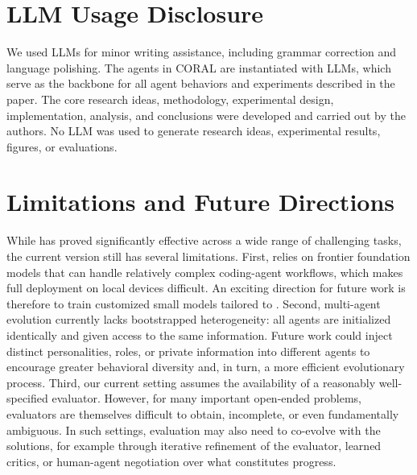 

\appendix

\section*{LLM Usage Disclosure}
We used LLMs for minor writing assistance, including grammar correction and language polishing. The agents in CORAL are instantiated with LLMs, which serve as the backbone for all agent behaviors and experiments described in the paper. The core research ideas, methodology, experimental design, implementation, analysis, and conclusions were developed and carried out by the authors. No LLM was used to generate research ideas, experimental results, figures, or evaluations.

\section{Limitations and Future Directions}
\label{app:future_directions}
While \method{} has proved significantly effective across a wide range of challenging tasks, the current version still has several limitations. First, \method{} relies on frontier foundation models that can handle relatively complex coding-agent workflows, which makes full deployment on local devices difficult. An exciting direction for future work is therefore to train customized small models tailored to \method{}. Second, multi-agent evolution currently lacks bootstrapped heterogeneity: all agents are initialized identically and given access to the same information. Future work could inject distinct personalities, roles, or private information into different agents to encourage greater behavioral diversity and, in turn, a more efficient evolutionary process. Third, our current setting assumes the availability of a reasonably well-specified evaluator. However, for many important open-ended problems, evaluators are themselves difficult to obtain, incomplete, or even fundamentally ambiguous. In such settings, evaluation may also need to co-evolve with the solutions, for example through iterative refinement of the evaluator, learned critics, or human-agent negotiation over what constitutes progress. 
